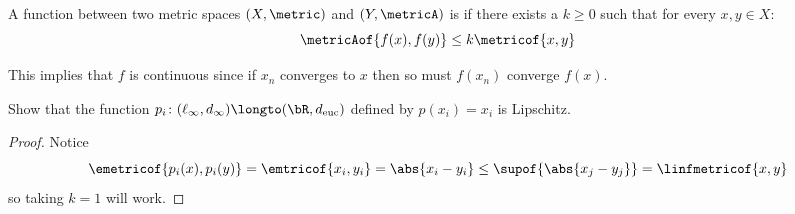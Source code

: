 \documentclass[10pt]{article}
\begin{document}


\bigskip

\begin{defn*}

    A function between two metric spaces $(X,\metric)$ and $(Y,\metricA)$ is  if there exists a $k\geq0$ such that for every $x,y\in X$:\
    \[ \metricAof{f(x), f(y)} \leq k\metricof{x,y} \]

\end{defn*}

This implies that $f$ is continuous since if $x_n$ converges to $x$ then so must $f(x_n)$ converge $f(x)$.

\begin{exerc*}

    Show that the function $p_i\colon (\ell_\infty, d_\infty)\longto(\bR, d_{\rm euc})$ defined by $p(x_i)=x_i$ is Lipschitz.

\end{exerc*}

\begin{proof}

    Notice
    \[ \emetricof{p_i(x), p_i(y)}=\emtricof{x_i,y_i}=\abs{x_i-y_i}\leq\supof{\abs{x_j-y_j}}=\linfmetricof{x,y} \]
    so taking $k=1$ will work.

\end{proof}
\end{document}
